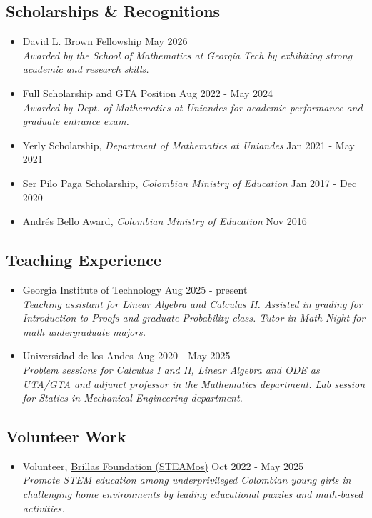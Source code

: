 \documentclass{article}
\begin{document}
\subsection*{Scholarships \& Recognitions}
\begin{itemize}
\item David L. Brown Fellowship \hfill May 2026\\
\textit{\small Awarded by the School of Mathematics at Georgia Tech by exhibiting strong academic and research skills.}
\item Full Scholarship and GTA Position \hfill Aug 2022 - May 2024\\
\textit{\small Awarded by Dept. of Mathematics at Uniandes for academic performance and graduate entrance exam.}
\item Yerly Scholarship, \textit{\small Department of Mathematics at Uniandes} \hfill Jan 2021 - May 2021
\item Ser Pilo Paga Scholarship, \textit{\small Colombian Ministry of Education} \hfill Jan 2017 - Dec 2020
\item Andr\'es Bello Award, \textit{\small Colombian Ministry of Education} \hfill Nov 2016
\end{itemize}

\subsection*{Teaching Experience}
\begin{itemize}
  \item Georgia Institute of Technology \hfill Aug 2025 - present\\
\textit{\small Teaching assistant for Linear Algebra and Calculus II. Assisted in grading for Introduction to Proofs and graduate Probability class. Tutor in Math Night for math undergraduate majors.}
  \item Universidad de los Andes \hfill Aug 2020 - May 2025\\
\textit{\small Problem sessions for Calculus I and II, Linear Algebra and ODE as UTA/GTA and adjunct professor in the Mathematics department. Lab session for Statics in Mechanical Engineering department.}
\end{itemize}
\subsection*{Volunteer Work}
\begin{itemize}
\item Volunteer, \href{https://fundacionbrillas.org/equipo-brillas/}{\textcolor{myblue}{Brillas Foundation (STEAMos)}} \hfill Oct 2022 - May 2025\\
\textit{\small Promote STEM education among underprivileged Colombian young girls in challenging home environments by leading educational puzzles and math-based activities.}
\end{itemize}
\end{document}
